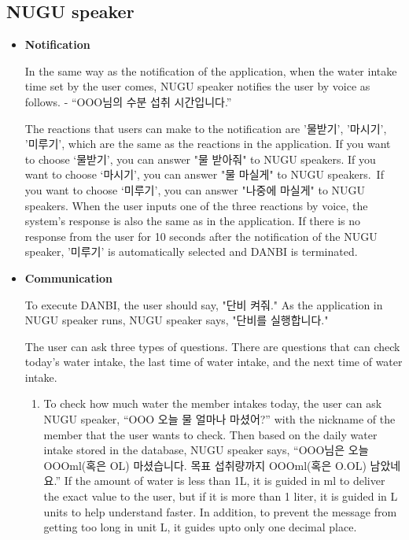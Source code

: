 \documentclass[conference]{IEEEtran}
\begin{document}
\subsection{NUGU speaker}
\begin{itemize}
\setlength{\parindent}{2ex}
\setlength{\parskip}{0.5em}
\item \textbf{Notification}

In the same way as the notification of the application, when the water intake time set by the user comes, NUGU speaker notifies the user by voice as follows. - “OOO님의 수분 섭취 시간입니다.”

The reactions that users can make to the notification are '물받기', '마시기', '미루기', which are the same as the reactions in the application. If you want to choose ‘물받기’, you can answer "물 받아줘" to NUGU speakers. If you want to choose ‘마시기’, you can answer "물 마실게" to NUGU speakers. If you want to choose ‘미루기’, you can answer "나중에 마실게" to NUGU speakers. When the user inputs one of the three reactions by voice, the system's response is also the same as in the application. If there is no response from the user for 10 seconds after the notification of the NUGU speaker, '미루기' is automatically selected and DANBI is terminated.

\item \textbf{Communication}

To execute DANBI, the user should say, "단비 켜줘." As the application in NUGU speaker runs, NUGU speaker says, "단비를 실행합니다."

The user can ask three types of questions. There are questions that can check today's water intake, the last time of water intake, and the next time of water intake.

\begin{enumerate}
\setlength{\parindent}{2ex}

\item To check how much water the member intakes today, the user can ask NUGU speaker, “OOO 오늘 물 얼마나 마셨어?” with the nickname of the member that the user wants to check. Then based on the daily water intake stored in the database, NUGU speaker says, “OOO님은 오늘 OOOml(혹은 OL) 마셨습니다. 목표 섭취량까지 OOOml(혹은 O.OL) 남았네요.” If the amount of water is less than 1L, it is guided in ml to deliver the exact value to the user, but if it is more than 1 liter, it is guided in L units to help understand faster. In addition, to prevent the message from getting too long in unit L, it guides upto only one decimal place.


\end{enumerate}
\end{itemize}
\end{document}
